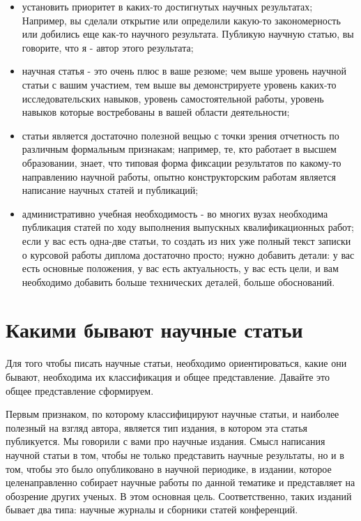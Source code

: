 \documentclass{report}
\begin{document}
\begin{itemize}
	\item установить приоритет в каких-то достигнутых научных результатах; Например, вы сделали открытие или определили какую-то закономерность или добились еще как-то научного результата. Публикую научную статью, вы говорите, что я - автор этого результата;
	\item научная статья - это очень плюс в ваше резюме; чем выше уровень научной статьи с вашим участием, тем выше вы демонстрируете уровень каких-то исследовательских навыков, уровень самостоятельной работы, уровень навыков которые востребованы в вашей области деятельности;
	\item статьи является достаточно полезной вещью с точки зрения отчетность по различным формальным признакам; например, те, кто работает в высшем образовании, знает, что типовая форма фиксации результатов по какому-то направлению научной работы, опытно конструкторским работам является написание научных статей и публикаций;
	\item административно учебная необходимость - во многих вузах необходима публикация статей по ходу выполнения выпускных квалификационных работ; если у вас есть одна-две статьи, то создать из них уже полный текст записки о курсовой работы диплома достаточно просто; нужно добавить детали: у вас есть основные положения, у вас есть актуальность, у вас есть цели, и вам необходимо добавить больше технических деталей, больше обоснований.
\end{itemize}

\section{Какими бывают научные статьи}
Для того чтобы писать научные статьи, необходимо ориентироваться, какие они бывают, необходима их классификация и общее представление. Давайте это общее представление сформируем.

Первым признаком, по которому классифицируют научные статьи, и наиболее полезный на взгляд автора, является тип издания, в котором эта статья публикуется. Мы говорили с вами про научные издания. Смысл написания научной статьи в том, чтобы не только представить научные результаты, но и в том, чтобы это было опубликовано в научной периодике, в издании, которое целенаправленно собирает научные работы по данной тематике и представляет на обозрение других ученых. В этом основная цель. Соответственно, таких изданий бывает два типа: научные журналы и сборники статей конференций.
\end{document}
